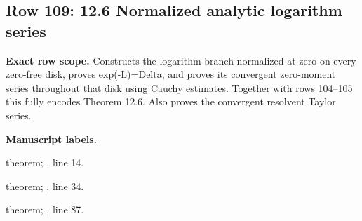 \subsection{Row 109: 12.6 Normalized analytic logarithm series}
\label{row:109}
\textbf{Exact row scope.} Constructs the logarithm branch normalized at zero on every zero-free disk, proves exp(-L)=Delta, and proves its convergent zero-moment series throughout that disk using Cauchy estimates. Together with rows 104--105 this fully encodes Theorem 12.6. Also proves the convergent resolvent Taylor series.\par\smallskip
\textbf{Manuscript labels.} \par\smallskip
{\small{}\par}
{\footnotesize\color{muted}theorem; , line 14.\par}\smallskip
{\small{}\par}
{\footnotesize\color{muted}theorem; , line 34.\par}\smallskip
{\small{}\par}
{\footnotesize\color{muted}theorem; , line 87.\par}\smallskip
{}
